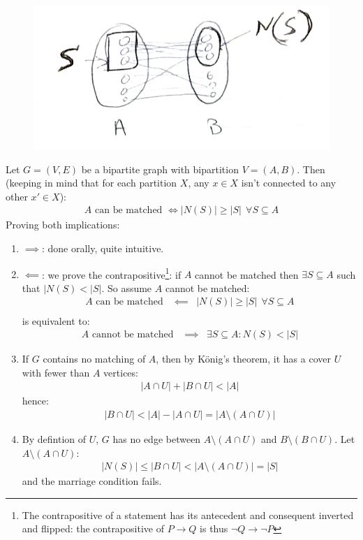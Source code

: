 \documentclass[11pt]{book}
\begin{document}
\begin{figure}[h]
	\center
	\includegraphics[width=0.3\linewidth]{img/2-1.png}
\end{figure}  
Let $G = (V, E)$ be a bipartite graph with bipartition $V = (A, B)$. Then (keeping in mind that for each partition $X$, any $x \in X$ isn't connected to any other $x' \in X$):
\begin{eqnarray}
	A \text{ can be matched } \iff |N(S)| \geq |S| ~~\forall S \subseteq A
\end{eqnarray} 
Proving both implications:
\begin{enumerate}
	\item $\implies$: done orally, quite intuitive.
	\item $\impliedby$: we prove the contrapositive\footnote{The contrapositive of a statement has its antecedent and consequent inverted and flipped: the contrapositive of $P \rightarrow Q$ is thus $\neg Q \rightarrow \neg P$}: if $A$ cannot be matched then $\exists S \subseteq A$ such that $|N(S) < |S|$. So assume $A$ cannot be matched:
		\begin{eqnarray}
			A \text{ can be matched } &\impliedby& |N(S)| \geq |S| ~~\forall S \subseteq A \\
		\end{eqnarray}
		is equivalent to:
		\begin{eqnarray}
			A \text{ cannot be matched } &\implies& \exists S \subseteq A : N(S) < |S|
		\end{eqnarray} 
	\item If $G$ contains no matching of $A$, then by König's theorem, it has a cover $U$ with fewer than $A$ vertices:
		\begin{eqnarray}
			|A \cap U| + |B \cap U| < |A|
		\end{eqnarray}
		hence:
		\begin{eqnarray}
			|B \cap U| < |A| - |A \cap U| = |A \setminus (A \cap U)|
		\end{eqnarray}
	\item By defintion of $U$, $G$ has no edge between $A \setminus (A \cap U)$ and $B \setminus (B \cap U)$. Let $A \setminus (A \cap U)$:
		\begin{eqnarray}
			|N(S)| \leq |B \cap U| < |A \setminus (A \cap U)| = |S|
		\end{eqnarray} 
		and the marriage condition fails.
\end{enumerate}
\end{document}
